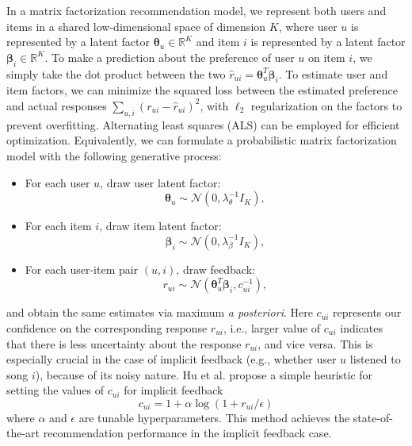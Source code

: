 In a matrix factorization recommendation model, we represent both users and items in a shared low-dimensional space of dimension $K$, where user $u$ is represented by a latent factor $\boldsymbol\theta_u \in \mathbb{R}^K$ and item $i$ is represented by a latent factor $\boldsymbol\beta_i \in \mathbb{R}^K$. To make a prediction about the preference of user $u$ on item $i$, we simply take the dot product between the two $\hat{r}_{ui} = \boldsymbol\theta_u^T \boldsymbol\beta_i$. To estimate user and item factors, we can minimize the squared loss between the estimated preference and actual responses $\sum_{u, i} (r_{ui} - \hat{r}_{ui})^2$,  with $\ell_2$ regularization on the factors to prevent overfitting. Alternating least squares (ALS) can be employed for efficient optimization. Equivalently, we can formulate a probabilistic matrix factorization model \cite{mnih2007probabilistic} with the following generative process:
\begin{itemize}
\item For each user $u$, draw user latent factor:
\vspace{-0.05in}
\[\boldsymbol\theta_u \sim \mathcal{N}(0, \lambda_\theta^{-1} I_K),\]
\item \vspace{-0.08in}
For each item $i$, draw item latent factor:
\vspace{-0.05in}
\[\boldsymbol\beta_i \sim \mathcal{N}(0, \lambda_\beta^{-1} I_K),\]
\item \vspace{-0.08in}
For each user-item pair $(u, i)$, draw feedback: 
\[r_{ui} \sim \mathcal{N}(\boldsymbol\theta_u^T\boldsymbol\beta_i, c_{ui}^{-1}),\]
\end{itemize}
\vspace{-0.08in}
and obtain the same estimates via maximum \emph{a posteriori}. 
Here $c_{ui}$ represents our confidence on the corresponding response $r_{ui}$, i.e., larger value of $c_{ui}$ indicates that there is less uncertainty about the response $r_{ui}$, and vice versa. 
This is especially crucial in the case of implicit feedback (e.g., whether user $u$ listened to song $i$), because of its noisy nature. 
Hu et al. \cite{hu2008collaborative} propose a simple heuristic for setting the values of $c_{ui}$ for implicit feedback
\[c_{ui} = 1 +  \alpha \log(1 + r_{ui} / \epsilon)\]
where $\alpha$ and $\epsilon$ are tunable hyperparameters. This method achieves the state-of-the-art recommendation performance in the implicit feedback case.

